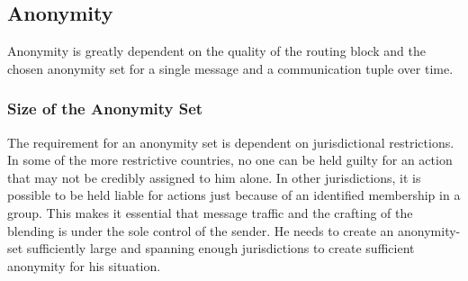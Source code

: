 \subsection{Anonymity}
Anonymity is greatly dependent on the quality of the routing block and the chosen anonymity set for a single message and a communication tuple over time. 

\subsubsection{Size of the Anonymity Set}
The requirement for an anonymity set is dependent on jurisdictional restrictions. In some of the more restrictive countries, no one can be held guilty for an action that may not be credibly assigned to him alone. In other jurisdictions, it is possible to be held liable for actions just because of an identified membership in a group. This makes it essential that message traffic and the crafting of the blending is under the sole control of the sender. He needs to create an anonymity-set sufficiently large and spanning enough jurisdictions to create sufficient anonymity for his situation.

  
  
  
  
  
  
